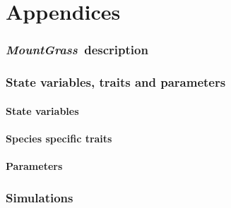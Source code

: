 \documentclass[review]{elsarticle}
\newcommand{\model}{\textbf{\textit{MountGrass}}~}
\begin{document}
\part*{Appendices}


\section{\model description}

\section{State variables, traits and parameters}
\subsection{State variables}
\subsection{Species specific traits}
\subsection{Parameters}

\section{Simulations}
\end{document}
